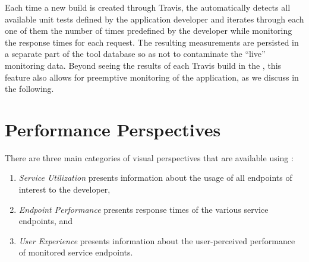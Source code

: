 \documentclass{sig-alternate-05-2015}
\begin{document}
  Each time a new build is created through Travis, the \tool automatically detects all available unit tests defined by the application developer and iterates through each one of them the number of times predefined by the developer while monitoring the response times for each request. The resulting measurements are persisted in a separate part of the tool database so as not to contaminate the ``live'' monitoring data. Beyond seeing the results of each Travis build in the \tool, this feature also allows for preemptive monitoring of the application, as we discuss in the following.    

  
  

  

\section{Performance Perspectives}
\label{sec:views}

  There are three main categories of visual perspectives that are available using \tool:
  \begin{enumerate}
    \item \textit{Service Utilization} presents information about the usage of all endpoints of interest to the developer,
    \item \textit{Endpoint Performance} presents response times of the various service endpoints, and
    \item \textit{User Experience} presents information about the user-perceived performance of monitored service endpoints.
  \end{enumerate}
\end{document}
